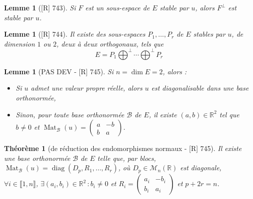 \documentclass[10pt, a4paper, parskip=full, twoside, twocolumn]{report}
\newtheorem{theorem}[definition]{Théorème}
\newtheorem{lemma}[definition]{Lemme}
\newcommand{\IR}{\mathbb{R}}
\newcommand{\M}{\mathcal{M}}
\DeclareMathOperator{\Mat}{Mat}
\DeclareMathOperator{\diag}{diag}
\begin{document}
\begin{tcolorbox}[
    breakable, %
    colback=developpement, %
    colframe=gray!0!black, %
    boxrule=0pt, %
    arc=1mm, %
	boxsep=0pt,
	left=0pt, right=0pt, top=0pt, bottom=0pt
]
\begin{lemma}[\textnormal{[R] 743}]
	\label{151dev12}
	Si $F$ est un sous-espace de $E$ stable par $u$, alors $F^{\perp}$ est stable par $u$.
\end{lemma}
\begin{lemma}[\textnormal{[R] 744}]
	\label{151dev13}
	Il existe des sous-espaces $P_1,\dots, P_r$ de $E$ stables par $u$, de dimension $1$ ou $2$, deux à deux orthogonaux, tels que 
	$$E = P_1\bigoplus^{\perp}\cdots\bigoplus^{\perp} P_r$$
\end{lemma}
\end{tcolorbox}

\begin{lemma}[PAS DEV - \textnormal{[R] 745}]
	Si $n = \dim E = 2$, alors :
	\begin{itemize}
		\item Si $u$ admet une valeur propre réelle, alors $u$ est diagonalisable dans une base orthonormée,
		\item Sinon, pour toute base orthonormée $\mathcal{B}$ de $E$, il existe $(a,b)\in\IR^2$ tel que $b\neq 0$ et $\Mat_{\mathcal{B}}(u)=\begin{pmatrix}
			a & -b \\ b & a
		\end{pmatrix}$.
	\end{itemize}
\end{lemma}

\begin{tcolorbox}[
    breakable, %
    colback=developpement, %
    colframe=gray!0!black, %
    boxrule=0pt, %
    arc=1mm, %
	boxsep=0pt,
	left=0pt, right=0pt, top=0pt, bottom=0pt
]
\begin{theorem}[de réduction des endomorphismes normaux - \textnormal{[R] 745}]
	Il existe une base orthonormée $\mathcal{B}$ de $E$ telle que, par blocs, $\Mat_{\mathcal{B}}(u) = \diag(D_p, R_1,\dots, R_r)$, où 
	$D_p\in\M_n(\IR)$ est diagonale, $\forall i\in \llbracket 1,n\rrbracket$, $\exists (a_i, b_i)\in\IR^2\,\colon b_i \neq 0$ et $R_i = \begin{pmatrix}
		a_i & -b_i \\ b_i & a_i
	\end{pmatrix}$ et $p+2r = n$.
\end{theorem}
\end{tcolorbox}
\end{document}
